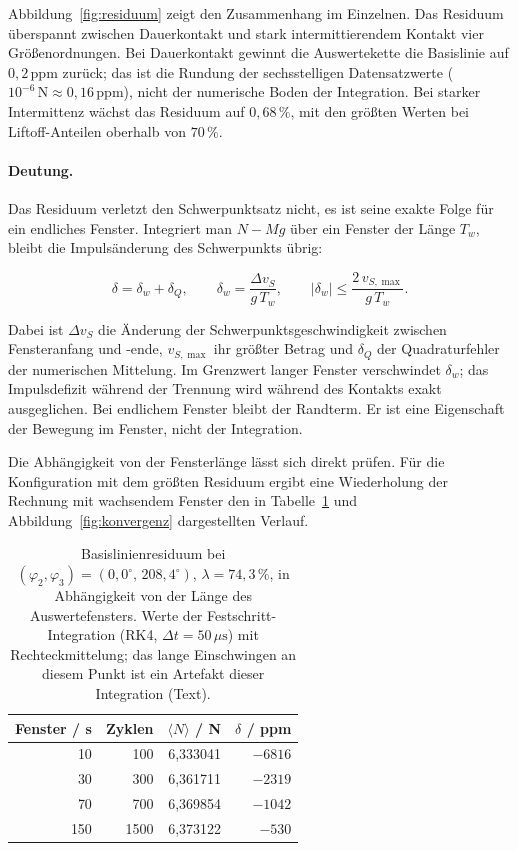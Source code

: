 \documentclass[12pt,a4paper]{report}
\begin{document}
Abbildung~\ref{fig:residuum} zeigt den Zusammenhang im Einzelnen. Das
Residuum überspannt zwischen Dauerkontakt und stark intermittierendem
Kontakt vier Größenordnungen. Bei Dauerkontakt gewinnt
die Auswertekette die Basislinie auf $0{,}2\,\mathrm{ppm}$ zurück; das
ist die Rundung der sechsstelligen Datensatzwerte
($10^{-6}\,\mathrm{N} \approx 0{,}16\,\mathrm{ppm}$), nicht der numerische
Boden der Integration. Bei starker Intermittenz wächst
das Residuum auf $0{,}68\,\%$, mit den größten Werten bei
Liftoff-Anteilen oberhalb von $70\,\%$.

\paragraph{Deutung.}
Das Residuum verletzt den Schwerpunktsatz nicht, es ist seine exakte
Folge für ein endliches Fenster. Integriert man $N - Mg$ über ein Fenster
der Länge $T_w$, bleibt die Impulsänderung des Schwerpunkts übrig:

\begin{equation}
  \delta = \delta_w + \delta_Q, \qquad
  \delta_w = \frac{\Delta v_S}{g\,T_w}, \qquad
  |\delta_w| \le \frac{2\,v_{S,\max}}{g\,T_w}.
  \label{eq:randterm}
\end{equation}

Dabei ist $\Delta v_S$ die Änderung der Schwerpunktsgeschwindigkeit
zwischen Fensteranfang und -ende, $v_{S,\max}$ ihr größter Betrag und
$\delta_Q$ der Quadraturfehler der numerischen Mittelung. Im Grenzwert
langer Fenster verschwindet $\delta_w$; das Impulsdefizit während der
Trennung wird während des Kontakts exakt ausgeglichen. Bei endlichem
Fenster bleibt der Randterm. Er ist eine Eigenschaft der Bewegung im
Fenster, nicht der Integration.

Die Abhängigkeit von der Fensterlänge lässt sich direkt prüfen. Für die Konfiguration mit dem größten Residuum ergibt eine
Wiederholung der Rechnung mit wachsendem Fenster den in
Tabelle~\ref{tab:konvergenz} und Abbildung~\ref{fig:konvergenz}
dargestellten Verlauf.

\begin{table}[htbp]
  \centering
  \begin{tabular}{rrrr}
    \hline
    Fenster / s & Zyklen & $\langle N \rangle$ / N & $\delta$ / ppm \\
    \hline
     10 &  100 & 6{,}333041 & $-6816$ \\
     30 &  300 & 6{,}361711 & $-2319$ \\
     70 &  700 & 6{,}369854 & $-1042$ \\
    150 & 1500 & 6{,}373122 & $-530$ \\
    \hline
  \end{tabular}
  \caption{Basislinienresiduum bei $(\varphi_2, \varphi_3) =
  (0{,}0^\circ,\, 208{,}4^\circ)$, $\lambda = 74{,}3\,\%$, in
  Abhängigkeit von der Länge des Auswertefensters. Werte der
  Festschritt-Integration (RK4, $\Delta t = 50\,\mu\mathrm{s}$) mit
  Rechteckmittelung; das lange Einschwingen an diesem Punkt ist ein
  Artefakt dieser Integration (Text).}
  \label{tab:konvergenz}
\end{table}
\end{document}
